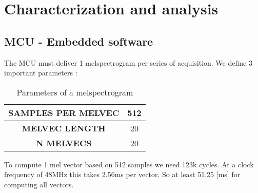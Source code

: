 \documentclass{article}
\begin{document}
 
\section{Characterization and analysis}

\subsection{MCU - Embedded software}

The MCU must deliver 1 melspectrogram per series of acquisition. We define 3 important parameters :\\
\begin{table}[H]
    \centering
    \begin{tabular}{|c|c|}
        \hline
        \textbf{SAMPLES PER MELVEC} & 512 \\
        \hline
        \textbf{MELVEC LENGTH} & 20 \\
        \hline
        \textbf{N MELVECS} & 20 \\
        \hline
    \end{tabular}
    \caption{Parameters of a melspectrogram}
    \label{tab:my_label}
\end{table}
To compute 1 mel vector based on 512 samples we need 123k cycles. At a clock frequency of 48MHz this takes 2.56ms per vector. So at least 51.25 [ms] for computing all vectors.
\end{document}
